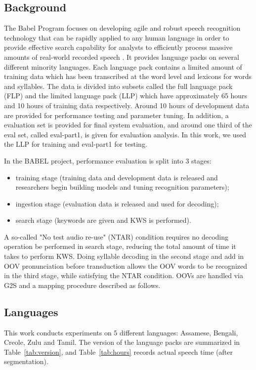 \documentclass[journal]{IEEEtran}
\begin{document}
\subsection{Background}
The Babel Program focuses on developing agile and robust speech recognition technology that can be 
rapidly applied to any human language in order to provide effective search capability for analysts to 
efficiently process massive amounts of real-world recorded speech \cite{babel}. It provides language packs 
on several different minority languages. Each language pack contains a limited amount of training data 
which has been transcribed at the word level and lexicons for words and syllables. The data is divided 
into subsets called the full language pack (FLP) and the limited language pack (LLP) which have approximately 
65 hours and 10 hours of training data respectively. Around 10 hours of development data are provided 
for performance testing and parameter tuning. In addition, a evaluation set is provided for final 
system evaluation, and around one third of the eval set, called eval-part1, is given for evaluation analysis.
In this work, we used the LLP for training and eval-part1 for testing.

In the BABEL project, performance evaluation is split into 3 stages:
\begin{itemize}
\item training stage (training data and development data is released and researchers begin building models 
and tuning recognition parameters);
\item ingestion stage (evaluation data is released and used for decoding);
\item search stage (keywords are given and KWS is performed).
\end{itemize}

A so-called "No test audio re-use" (NTAR) condition requires no decoding operation be performed in search stage, 
reducing the total amount of time it takes to perform KWS. Doing syllable decoding in the second stage and add in 
OOV pronunciation before transduction allows the OOV words to be recognized in the third stage, while satisfying 
the NTAR condition. OOVs are handled via G2S and a mapping procedure described as follows.

\subsection{Languages}
This work conducts experiments on 5 different languages: Assamese, Bengali, Creole, Zulu and Tamil.
The version of the language packs are summarized in Table~\ref{tab:version}, and Table~\ref{tab:hours} records actual
speech time (after segmentation).
\end{document}
